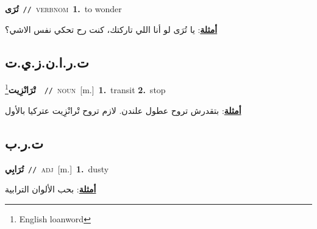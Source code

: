 \documentclass[10pt,a4paper,twoside]{article} %
\begin{document}
\begin{multicols}{2}
{{{{\setlength\topsep{0pt}\textbf{\foreignlanguage{arabic}{تُرَى}}\ {\color{gray}\texttt{//}\color{black}}\ \textsc{verb\textunderscore nom}\ \textbf{1.}~to wonder\  \begin{flushright}\color{gray}\foreignlanguage{arabic}{\textbf{\underline{\foreignlanguage{arabic}{أمثلة}}}: يا تُرَى لو أنا اللي تاركتك، كنت رح تحكي نفس الاشي؟}\end{flushright}\color{black}} \vspace{2mm}

\vspace{-3mm}
\subsection*{\color{blue}\foreignlanguage{arabic}{ت.ر.ا.ن.ز.ي.ت}\color{blue}{ (ntws)}} 

{\setlength\topsep{0pt}\textbf{\foreignlanguage{arabic}{تْرَانْزِيت}}\footnote{English loanword}\ \ {\color{gray}\texttt{//}\color{black}}\ \textsc{noun}\ [m.]\ \textbf{1.}~transit  \textbf{2.}~stop\  \begin{flushright}\color{gray}\foreignlanguage{arabic}{\textbf{\underline{\foreignlanguage{arabic}{أمثلة}}}: بتقدرش تروح عطول علندن. لازم تروح تْرانْزِيت عتركيا بالأول}\end{flushright}\color{black}} \vspace{2mm}

\vspace{-3mm}
\subsection*{\color{blue}\foreignlanguage{arabic}{ت.ر.ب}\color{blue}{}} 

{\setlength\topsep{0pt}\textbf{\foreignlanguage{arabic}{تُرَابِي}}\ {\color{gray}\texttt{//}\color{black}}\ \textsc{adj}\ [m.]\ \textbf{1.}~dusty\  \begin{flushright}\color{gray}\foreignlanguage{arabic}{\textbf{\underline{\foreignlanguage{arabic}{أمثلة}}}: بحب الألوان الترابية}\end{flushright}\color{black}} \vspace{2mm}

}}}
\end{multicols}
\end{document}
